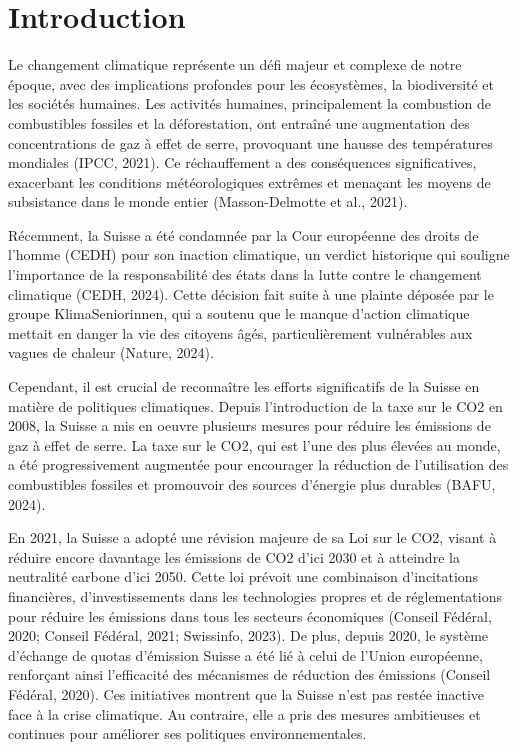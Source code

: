 \vspace{-1cm}
\section{Introduction}
\label{sec:introduction}


Le changement climatique représente un défi majeur et complexe de notre époque, avec des implications profondes pour les écosystèmes, la biodiversité et les sociétés humaines. Les activités humaines, principalement la combustion de combustibles fossiles et la déforestation, ont entraîné une augmentation des concentrations de gaz à effet de serre, provoquant une hausse des températures mondiales (IPCC, 2021)\supercite{ipcc_2021}. Ce réchauffement a des conséquences significatives, exacerbant les conditions météorologiques extrêmes et menaçant les moyens de subsistance dans le monde entier (Masson-Delmotte et al., 2021)\supercite{ipcc_2021}.



Récemment, la Suisse a été condamnée par la Cour européenne des droits de l'homme (CEDH) pour son inaction climatique, un verdict historique qui souligne l'importance de la responsabilité des états dans la lutte contre le changement climatique (CEDH, 2024)\supercite{CEDH2024}. Cette décision fait suite à une plainte déposée par le groupe KlimaSeniorinnen, qui a soutenu que le manque d'action climatique mettait en danger la vie des citoyens âgés, particulièrement vulnérables aux vagues de chaleur (Nature, 2024)\supercite{nature2024}.

Cependant, il est crucial de reconnaître les efforts significatifs de la Suisse en matière de politiques climatiques. Depuis l'introduction de la taxe sur le CO2 en 2008, la Suisse a mis en oeuvre plusieurs mesures pour réduire les émissions de gaz à effet de serre. La taxe sur le CO2, qui est l'une des plus élevées au monde, a été progressivement augmentée pour encourager la réduction de l'utilisation des combustibles fossiles et promouvoir des sources d'énergie plus durables (BAFU, 2024)\supercite{bafu2024}.


En 2021, la Suisse a adopté une révision majeure de sa Loi sur le CO2, visant à réduire encore davantage les émissions de CO2 d'ici 2030 et à atteindre la neutralité carbone d'ici 2050. Cette loi prévoit une combinaison d'incitations financières, d'investissements dans les technologies propres et de réglementations pour réduire les émissions dans tous les secteurs économiques (Conseil Fédéral, 2020; Conseil Fédéral, 2021; Swissinfo, 2023)\supercite{adminch2020,adminch2021,swissinfo2021}. De plus, depuis 2020, le système d'échange de quotas d'émission Suisse a été lié à celui de l'Union européenne, renforçant ainsi l'efficacité des mécanismes de réduction des émissions (Conseil Fédéral, 2020)\supercite{adminch2020}. Ces initiatives montrent que la Suisse n'est pas restée inactive face à la crise climatique. Au contraire, elle a pris des mesures ambitieuses et continues pour améliorer ses politiques environnementales.




